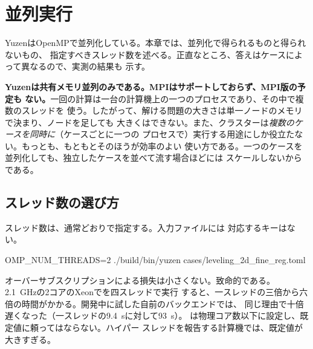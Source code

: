 \chapter{並列実行}
\label{ch:parallel}

YuzenはOpenMPで並列化している。本章では、並列化で得られるものと得られないもの、
指定すべきスレッド数を述べる。正直なところ、答えはケースによって異なるので、実測の結果も
示す。

\begin{warn}[分散メモリ並列は存在しない]
  \textbf{Yuzenは共有メモリ並列のみである。MPIはサポートしておらず、MPI版の予定も
  ない。}一回の計算は一台の計算機上の一つのプロセスであり、その中で複数のスレッドを
  使う。したがって、解ける問題の大きさは単一ノードのメモリで決まり、ノードを足しても
  大きくはできない。また、クラスターは\emph{複数のケースを同時に}（ケースごとに一つの
  プロセスで）実行する用途にしか役立たない。もっとも、もともとそのほうが効率のよい
  使い方である。一つのケースを並列化しても、独立したケースを並べて流す場合ほどには
  スケールしないからである。
\end{warn}

\section{スレッド数の選び方}
\label{sec:parallel:threads}

スレッド数は、通常どおりで指定する。入力ファイルには
対応するキーはない。

\begin{shell}
OMP_NUM_THREADS=2 ./build/bin/yuzen cases/leveling_2d_fine_reg.toml
\end{shell}

\begin{warn}[物理コア数を超えるスレッドを指定してはならない]
  オーバーサブスクリプションによる損失は小さくない。致命的である。
  \SI{2.1}{\giga\hertz}の2コアのXeonでを四スレッドで実行
  すると、一スレッドの三倍から六倍の時間がかかる。開発中に試した自前のバックエンドでは、
  同じ理由で十倍遅くなった（一スレッドの\SI{9.4}{\second}に対して\SI{93}{\second}）。
  は物理コア数以下に設定し、既定値に頼ってはならない。ハイパー
  スレッドを報告する計算機では、既定値が大きすぎる。
\end{warn}

